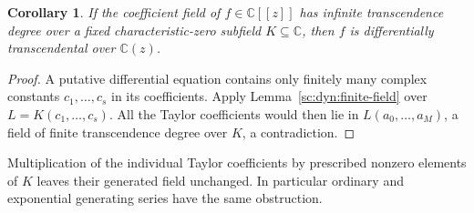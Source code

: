 \documentclass[11pt,a4paper]{article}
\newtheorem{corollary}[theorem]{Corollary}
\theoremstyle{definition}
\theoremstyle{remark}
\theoremstyle{plain}
\numberwithin{equation}{section}
\begin{document}
\begin{corollary}\label{sc:dyn:infinite-rank}
If the coefficient field of $f\in\mathbb C[[z]]$ has infinite
transcendence degree over a fixed characteristic-zero subfield
$K\subseteq\mathbb C$, then $f$ is differentially transcendental over
$\mathbb C(z)$.
\end{corollary}
\begin{proof}
A putative differential equation contains only finitely many complex
constants $c_1,\ldots,c_s$ in its coefficients. Apply
Lemma~\ref{sc:dyn:finite-field} over $L=K(c_1,\ldots,c_s)$. All the Taylor
coefficients would then lie in $L(a_0,\ldots,a_M)$, a field of finite
transcendence degree over $K$, a contradiction.
\end{proof}
Multiplication of the individual Taylor coefficients by prescribed
nonzero elements of $K$ leaves their generated field unchanged.
In particular ordinary and exponential generating series have the
same obstruction.
\end{document}
